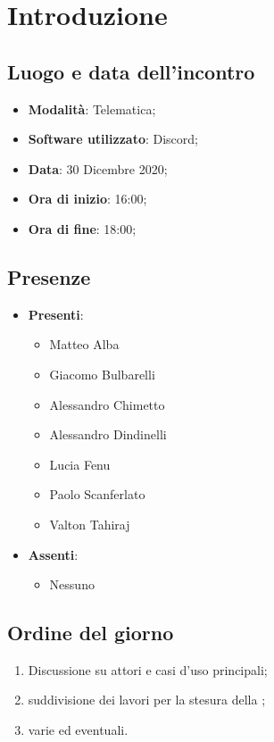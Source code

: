 \documentclass[]{article}
\begin{document}
	

	\newpage

	\section{Introduzione}
		\subsection{Luogo e data dell'incontro}
		\begin{itemize}
			\item \textbf{Modalità}: Telematica;
			\item \textbf{Software utilizzato}: Discord;
			\item \textbf{Data}: 30 Dicembre 2020;
			\item \textbf{Ora di inizio}: 16:00;
			\item \textbf{Ora di fine}: 18:00;
		\end{itemize}

		\subsection{Presenze}
		\begin{itemize}
			\item \textbf{Presenti}:
		\begin{itemize}
			\item Matteo Alba
			\item Giacomo Bulbarelli
			\item Alessandro Chimetto
			\item Alessandro Dindinelli
			\item Lucia Fenu
			\item Paolo Scanferlato
			\item Valton Tahiraj
		\end{itemize}
			\item \textbf{Assenti}:
			\begin{itemize}
				\item Nessuno
			\end{itemize}
		\end{itemize}

		\subsection{Ordine del giorno}
		\begin{enumerate}
			\item Discussione su attori e casi d'uso principali;
            \item suddivisione dei lavori per la stesura della ;
            \item varie ed eventuali.
		\end{enumerate}
\end{document}
